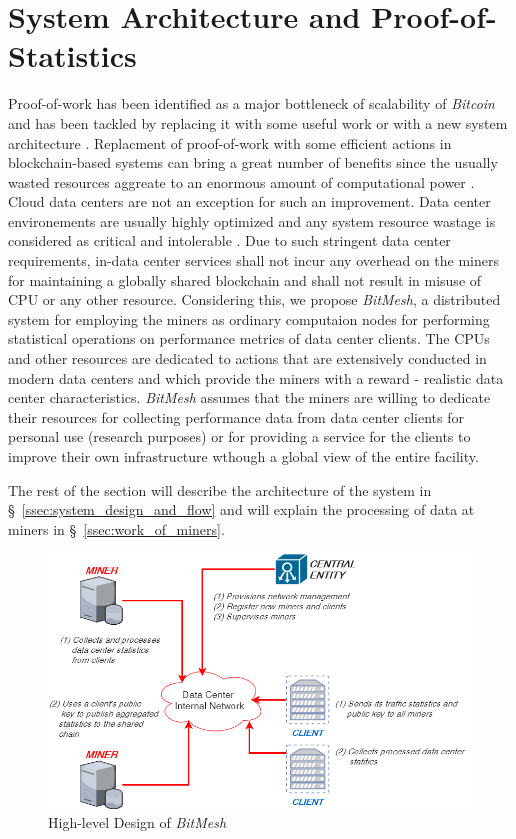 \documentclass[11px]{article}
\newcommand{\projTitle}{BitMesh\xspace}
\begin{document}
\section{System Architecture and Proof-of-Statistics}
Proof-of-work has been identified as a major bottleneck of scalability of \textit{Bitcoin}  and has been tackled by replacing it with some useful work \cite{filecoin-storage} or with a new system architecture \cite{RSCoin-bank}.  Replacment of proof-of-work with some
efficient actions in blockchain-based systems can bring a great number of benefits since the usually wasted resources aggreate to an enormous amount of  computational power \cite{bitcoin-comp-elec-power}. Cloud data centers are not an exception for such an
improvement. Data center environements are usually highly optimized and any system resource wastage is considered as critical and intolerable \cite{google-ai-power, facebook-cold-storage-rack}. Due to such stringent data center requirements, in-data center services
shall not incur any overhead on the miners for maintaining a globally shared blockchain and shall not result in misuse of CPU or any other resource. Considering this, we propose \textit{\projTitle}, a distributed system for employing the miners as ordinary computaion nodes for performing statistical operations on performance metrics of data center clients. The CPUs and other resources are dedicated to actions that are extensively conducted in modern data centers \cite{microsoft-autopilot} and which provide the miners with a reward - realistic data center characteristics. \textit{\projTitle} assumes that the miners are willing to dedicate their resources for collecting performance data from data center clients for personal use (research purposes) or for providing a service for the clients to improve their own infrastructure wthough a global view of the entire facility.

The rest of the section will describe the architecture of the system in \S\ \ref{ssec:system_design_and_flow} and will explain
the processing of data at miners in \S\ \ref{ssec:work_of_miners}.

\begin{figure}[h!]
  \begin{center}
    \includegraphics[width=0.8\linewidth]{figures/project_design.png}
    \caption{High-level Design of \textit{\projTitle}}
    \label{fig:project_design}
  \end{center}
\end{figure}
\end{document}
